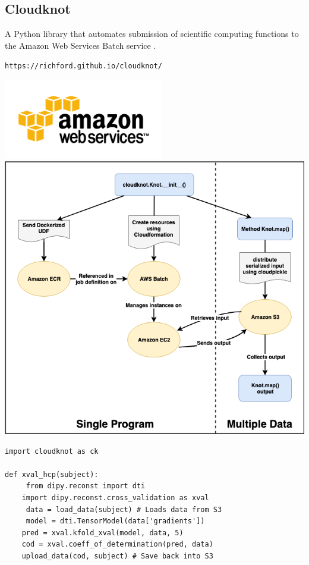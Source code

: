\documentclass[a0, landscape]{a0poster}
\begin{document}
\begin{multicols}{3}
\subsection*{Cloudknot}

A Python library that automates submission of scientific computing functions
to the Amazon Web Services Batch service \cite{adam_richie-halford-proc-scipy-2018}.

\texttt{https://richford.github.io/cloudknot/}

\begin{minipage}[b]{1\linewidth}
\begin{minipage}[b]{0.45\linewidth}
  \includegraphics[height=3.5cm]{AWS.png}\\
  \includegraphics[width=14cm]{ck-architecture.png}
\end{minipage}
\begin{minipage}[b]{0.55\linewidth}
\begin{lstlisting}
import cloudknot as ck

def xval_hcp(subject):
	 from dipy.reconst import dti
    import dipy.reconst.cross_validation as xval
	 data = load_data(subject) # Loads data from S3
	 model = dti.TensorModel(data['gradients'])
    pred = xval.kfold_xval(model, data, 5)
    cod = xval.coeff_of_determination(pred, data)
    upload_data(cod, subject) # Save back into S3


\end{lstlisting}
\end{minipage}
\end{minipage}
\end{multicols}
\end{document}
